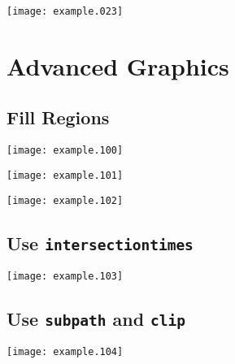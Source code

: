 \documentclass{article}
\newcommand{\figwidth}{0.95\linewidth}
\begin{document}
\begin{minipage}{\linewidth}
\centering
\texttt{[image: example.023]}
\end{minipage}

\newpage
\section{Advanced Graphics}

\subsection{Fill Regions}
\begin{minipage}{\linewidth}
\begin{minipage}{0.5\linewidth}
\texttt{[image: example.100]}
\end{minipage}
\hfill
\begin{minipage}{0.4\linewidth}
\texttt{[image: example.101]}
\end{minipage}
\end{minipage}
\bigskip

\begin{minipage}{\linewidth}
\centering
\begin{minipage}{0.8\linewidth}
\texttt{[image: example.102]}
\end{minipage}
\end{minipage}
\bigskip

\subsection{Use \texttt{intersectiontimes}}
\begin{minipage}{\linewidth}
\centering
\begin{minipage}{0.4\linewidth}
\texttt{[image: example.103]}
\end{minipage}
\end{minipage}
\bigskip

\subsection{Use \texttt{subpath} and \texttt{clip}}
\begin{minipage}{\linewidth}
\centering
\begin{minipage}{0.6\linewidth}
\texttt{[image: example.104]}
\end{minipage}
\end{minipage}
\bigskip
\end{document}
